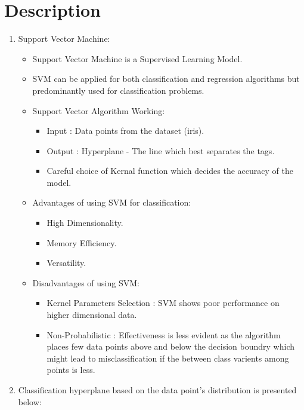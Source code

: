 \documentclass[a4paper,10pt]{article}
\begin{document}
\section{Description}
\begin{enumerate}
	\item Support Vector Machine:
	\begin{itemize}
		\item Support Vector Machine is a Supervised Learning Model.
		\item SVM can be applied for both classification and regression algorithms but predominantly used for classification problems.	 
		\item Support Vector Algorithm Working:
		\begin{itemize}
		 \item Input : Data points from the dataset (iris).
		 \item Output : Hyperplane - The line which best separates the tags.
		 \item Careful choice of Kernal function which decides the accuracy of the model.	
		\end{itemize}
	    \item Advantages of using SVM for classification:
	    \begin{itemize}
	    	\item High Dimensionality.
	    	\item Memory Efficiency.
	    	\item Versatility.	
	    \end{itemize}
       \item Disadvantages of using SVM:
       \begin{itemize}
       	\item Kernel Parameters Selection : SVM shows poor performance on higher dimensional data.
       	\item Non-Probabilistic : Effectiveness is less evident as the algorithm places few data points above and below the decision boundry which might lead to misclassification if the between class varients among points is less.
       \end{itemize}	
	\end{itemize}
    \item Classification hyperplane based on the data point's distribution is presented below:
     \begin{figure}[h]

\end{figure}
\end{enumerate}
\end{document}
